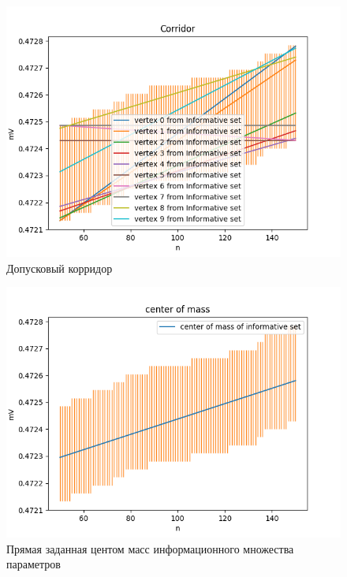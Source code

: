 \documentclass[a4paper,12pt]{article}
\begin{document}
\begin{figure}[H]
    \centering
    \includegraphics[width=12cm]{pics/corridor.png}
    \caption{Допусковый корридор}
    \label{fig:corridor}
\end{figure}

\begin{figure}[H]
    \centering
    \includegraphics[width=12cm]{pics/center_of_mass.png}
    \caption{Прямая заданная центом масс информационного множества параметров}
    \label{fig:center_of_mass}
\end{figure}
\end{document}
